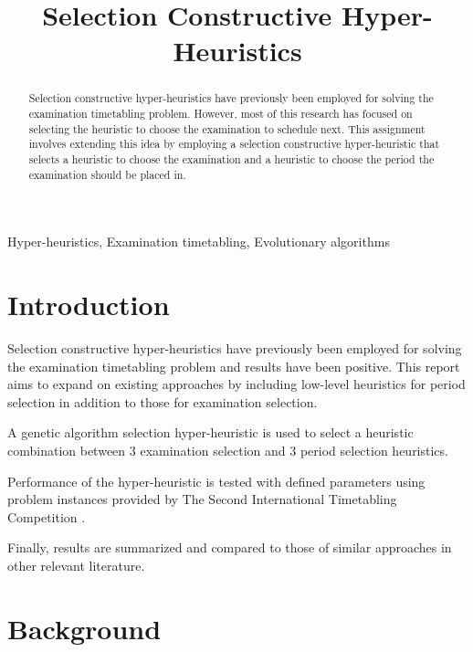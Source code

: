 \documentclass[conference]{IEEEtran}
\begin{document}
\title{Selection Constructive Hyper-Heuristics}

\author{
}

\maketitle

\begin{abstract}
Selection constructive hyper-heuristics have previously been employed for
solving the examination timetabling problem. However, most of this research has focused on selecting the heuristic to choose the examination
to schedule next. This assignment involves extending this idea by employing a selection constructive hyper-heuristic that selects a heuristic to
choose the examination and a heuristic to choose the period the examination should be placed in. 
\end{abstract}

\begin{IEEEkeywords}
Hyper-heuristics, Examination timetabling, Evolutionary algorithms 
\end{IEEEkeywords}

\section{Introduction}
Selection constructive hyper-heuristics have previously been employed for
solving the examination timetabling problem and results have been positive. This report aims to expand on existing approaches by including low-level heuristics for period selection in addition to those for examination selection.

A genetic algorithm  selection  hyper-heuristic is used to select a heuristic combination between 3 examination selection and 3 period selection heuristics.

Performance of the hyper-heuristic is tested with defined parameters using problem instances provided by The Second International Timetabling Competition \cite{mccollum2010setting}.

Finally, results are summarized and compared to those of similar approaches in other relevant literature.

\section{Background}
\end{document}
